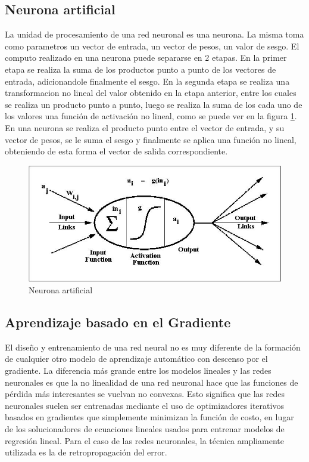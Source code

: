 \documentclass[a4paper,11pt,spanish]{book}
\begin{document}
      \subsection {Neurona artificial}
	La unidad de procesamiento de una red neuronal es una neurona. La misma toma como parametros un vector de entrada, un vector de pesos, un valor de sesgo. El computo realizado
	en una neurona puede separarse en 2 etapas. En la primer etapa se realiza la suma de los productos punto a punto de los vectores de entrada, adicionandole finalmente el sesgo.
	En la segunda etapa se realiza una transformacion no lineal del valor obtenido en la etapa anterior, 
	entre los cuales se realiza un producto
	punto a punto, luego se realiza la suma de los cada uno de los valores
	una función de activación no lineal,
	como se puede ver en la figura \ref{fig:neuron}.
	En una neurona se realiza el producto punto entre el vector de entrada, y su vector de pesos, se le suma el sesgo y finalmente se aplica una función no lineal, obteniendo
	de esta forma el vector de salida correspondiente.
	\begin{figure}[H]
          \begin{center}
            \includegraphics[width=0.4\linewidth]{./img/neuron.jpg}
	  \caption{Neurona artificial \label{fig:neuron}}
          \end{center}
	\end{figure}

      \subsection{Aprendizaje basado en el Gradiente}
	El diseño y entrenamiento de una red neural no es muy diferente de la formación de cualquier otro modelo de aprendizaje automático con descenso por el gradiente.
	La diferencia más grande entre los modelos lineales y las redes neuronales es que la no linealidad de una red neuronal hace que las funciones de pérdida
	más interesantes se vuelvan no convexas. Esto significa que las redes neuronales suelen ser entrenadas mediante el uso de optimizadores iterativos basados ​​en gradientes
	que simplemente minimizan la función de costo, en lugar de los solucionadores de ecuaciones lineales usados ​​para entrenar modelos de regresión lineal. Para el caso de las
	redes neuronales, la técnica ampliamente utilizada es la de retropropagación del error.
\end{document}
